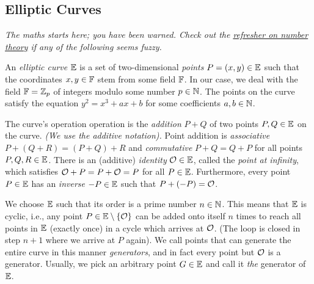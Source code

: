 \subsection{Elliptic Curves}

\emph{The maths starts here; you have been warned.
Check out the \href{https://explained-from-first-principles.com/number-theory/}{refresher on number theory} if any of the following seems fuzzy.}

An \emph{elliptic curve} $\mathbb{E}$ is a set of two-dimensional \emph{points} $P = (x, y) \in \mathbb{E}$
such that the coordinates $x, y \in \mathbb{F}$ stem from some field $\mathbb{F}$.
In our case,
we deal with the field $\mathbb{F} = \mathbb{Z}_p$ of integers modulo some number $p \in \mathbb{N}$.
The points on the curve satisfy the equation $y^2 = x^3 + ax + b$ for some coefficients $a, b \in \mathbb{N}$.

The curve's operation operation is the \emph{addition} $P + Q$ of two points $P, Q \in \mathbb{E}$ on the curve.
\emph{(We use the additive notation).}
Point addition is \emph{associative} $P + (Q + R) = (P + Q) + R$
and \emph{commutative} $P + Q = Q + P$ for all points $P, Q, R \in \mathbb{E}$.
%
There is an (additive) \emph{identity} $\mathcal{O} \in \mathbb{E}$,
called the \emph{point at infinity},
which satisfies $\mathcal{O} + P = P + \mathcal{O} = P$ for all $P \in \mathbb{E}$.
%
Furthermore,
every point $P \in \mathbb{E}$ has an \emph{inverse} $-P \in \mathbb{E}$ such that $P + (-P) = \mathcal{O}$.

We choose $\mathbb{E}$ such that its order is a prime number $n \in \mathbb{N}$.
This means that $\mathbb{E}$ is cyclic,
i.e., any point $P \in \mathbb{E} \setminus \{ \mathcal{O} \}$
can be added onto itself $n$ times to reach all points in $\mathbb{E}$ (exactly once)
in a cycle which arrives at $\mathcal{O}$.
(The loop is closed in step $n + 1$ where we arrive at $P$ again).
%
We call points that can generate the entire curve in this manner \emph{generators},
and in fact every point but $\mathcal{O}$ is a generator.
Usually,
we pick an arbitrary point $G \in \mathbb{E}$ and call it \emph{the} generator of $\mathbb{E}$.

